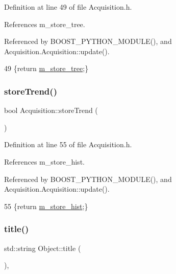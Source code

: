 Definition at line 49 of file Acquisition.\+h.



References m\+\_\+store\+\_\+tree.



Referenced by B\+O\+O\+S\+T\+\_\+\+P\+Y\+T\+H\+O\+N\+\_\+\+M\+O\+D\+U\+L\+E(), and Acquisition.\+Acquisition\+::update().


\begin{DoxyCode}
49 \{\textcolor{keywordflow}{return} \hyperlink{classAcquisition_aca2143e9135e25554e58327475a767c5}{m\_store\_tree};\}
\end{DoxyCode}
\mbox{\label{classAcquisition_a5af693448daef6e9e054ab7f1aa50784}} 
\subsubsection{\texorpdfstring{store\+Trend()}{storeTrend()}}
{\footnotesize\ttfamily bool Acquisition\+::store\+Trend (\begin{DoxyParamCaption}{ }\end{DoxyParamCaption})\hspace{0.3cm}{\ttfamily [inline]}}



Definition at line 55 of file Acquisition.\+h.



References m\+\_\+store\+\_\+hist.



Referenced by B\+O\+O\+S\+T\+\_\+\+P\+Y\+T\+H\+O\+N\+\_\+\+M\+O\+D\+U\+L\+E(), and Acquisition.\+Acquisition\+::update().


\begin{DoxyCode}
55 \{\textcolor{keywordflow}{return} \hyperlink{classAcquisition_a08f70edd83751dbdab4c8190dc4b9188}{m\_store\_hist};\}
\end{DoxyCode}
\mbox{\label{classObject_a73a0f1a41828fdd8303dd662446fb6c3}} 
\subsubsection{\texorpdfstring{title()}{title()}}
{\footnotesize\ttfamily std\+::string Object\+::title (\begin{DoxyParamCaption}{ }\end{DoxyParamCaption})\hspace{0.3cm}{\ttfamily [inline]}, {\ttfamily [inherited]}}




